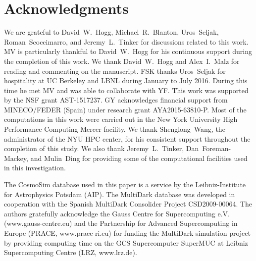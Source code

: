 \documentclass[english,usenatbib]{mn2e}
\begin{document}
\section*{Acknowledgments}

We are grateful to David~W.~Hogg, Michael~R.~Blanton, Uros~Seljak, Roman~Scoccimarro, and Jeremy~L.~Tinker for discussions related to this work.
MV is particularly thankful to David~W.~Hogg for his continuous support during the completion of this work. We thank David~W.~Hogg and Alex~I.~Malz for reading and commenting on the manuscript.
FSK thanks Uros~Seljak for hospitality at UC Berkeley and LBNL during January to July 2016. During this time he met MV and was able to collaborate with YF.
This work was supported by the NSF grant AST-1517237. GY acknowledges financial support from MINECO/FEDER  (Spain) under research grant AYA2015-63810-P. Most of the computations in this work were carried out in the New York University High Performance Computing Mercer facility. We thank Shenglong~Wang, the administrator of the NYU HPC center, for his consistent support throughout the completion of this study. We also thank Jeremy~L.~Tinker, Dan~Foreman-Mackey, and Mulin~Ding for providing some of the computational facilities used in this investigation.

The CosmoSim database used in this paper is a service by the Leibniz-Institute for Astrophysics Potsdam (AIP). The MultiDark database was developed in cooperation with the Spanish MultiDark Consolider Project CSD2009-00064. The authors gratefully acknowledge the Gauss Centre for Supercomputing e.V. (www.gauss-centre.eu) and the Partnership for Advanced Supercomputing in Europe (PRACE, www.prace-ri.eu) for funding the MultiDark simulation project by providing computing time on the GCS Supercomputer SuperMUC at Leibniz Supercomputing Centre (LRZ, www.lrz.de).


\end{document}
